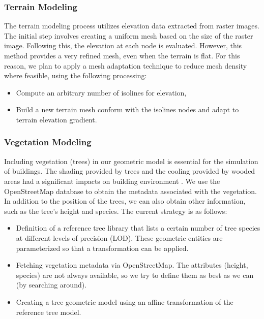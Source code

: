 \documentclass[runningheads]{llncs}
\begin{document}
\subsubsection{Terrain Modeling}
The terrain modeling process utilizes elevation data extracted from raster images. The initial step involves creating a uniform mesh based on the size of the raster image. Following this, the elevation at each node is evaluated.
However, this method provides a very refined mesh, even when the terrain is flat. For this reason, we plan to apply a mesh adaptation technique to reduce mesh density where feasible, using the following processing:
\begin{itemize}
    \item Compute an arbitrary number of isolines for elevation,
    \item Build a new terrain mesh conform with the isolines nodes and adapt to terrain elevation gradient.
\end{itemize}

\subsubsection{Vegetation Modeling}

Including vegetation (trees) in our geometric model is essential for the simulation of buildings. The shading provided by trees and the cooling provided by wooded areas had a significant impacts on building environment  . We use the OpenStreetMap database to obtain the metadata associated with the vegetation. In addition to the position of the trees, we can also obtain other information, such as the tree's height and species. The current strategy is as follows:

\begin{itemize}
\item Definition of a reference tree library that lists a certain number of tree species at different levels of precision (LOD). These geometric entities are parameterized so that a transformation can be applied.
\item Fetching vegetation metadata via OpenStreetMap. The attributes (height, species) are not always available, so we try to define them as best as we can (by searching around).
\item Creating a tree geometric model using an affine transformation of the reference tree model.
\end{itemize}
\end{document}
